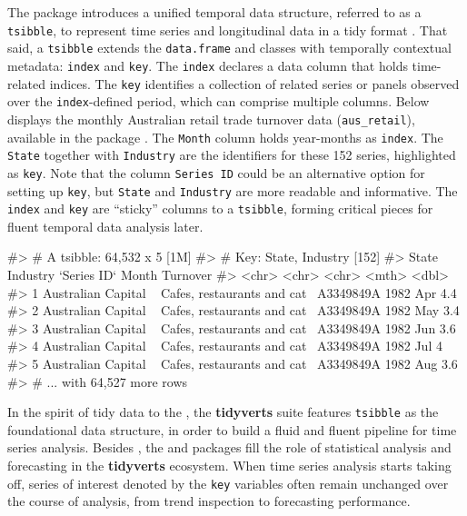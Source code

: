 The  package \citep{wang2020tsibble} introduces a
unified temporal data structure, referred to as a \texttt{tsibble}, to
represent time series and longitudinal data in a tidy format
\citep{wickham2014tidy}. That said, a \texttt{tsibble} extends the
\texttt{data.frame} and  classes with temporally
contextual metadata: \texttt{index} and \texttt{key}. The \texttt{index}
declares a data column that holds time-related indices. The \texttt{key}
identifies a collection of related series or panels observed over the
\texttt{index}-defined period, which can comprise multiple columns.
Below displays the monthly Australian retail trade turnover data
(\texttt{aus\_retail}), available in the  package
\citep{R-tsibbledata}. The \texttt{Month} column holds year-months as
\texttt{index}. The \texttt{State} together with \texttt{Industry} are
the identifiers for these 152 series, highlighted as \texttt{key}. Note
that the column \texttt{Series\ ID} could be an alternative option for
setting up \texttt{key}, but \texttt{State} and \texttt{Industry} are
more readable and informative. The \texttt{index} and \texttt{key} are
``sticky'' columns to a \texttt{tsibble}, forming critical pieces for
fluent temporal data analysis later.

\begin{Schunk}
\begin{Soutput}
#> # A tsibble: 64,532 x 5 [1M]
#> # Key:       State, Industry [152]
#>   State                Industry                    `Series ID`    Month Turnover
#>   <chr>                <chr>                       <chr>          <mth>    <dbl>
#> 1 Australian Capital ~ Cafes, restaurants and cat~ A3349849A   1982 Apr      4.4
#> 2 Australian Capital ~ Cafes, restaurants and cat~ A3349849A   1982 May      3.4
#> 3 Australian Capital ~ Cafes, restaurants and cat~ A3349849A   1982 Jun      3.6
#> 4 Australian Capital ~ Cafes, restaurants and cat~ A3349849A   1982 Jul      4  
#> 5 Australian Capital ~ Cafes, restaurants and cat~ A3349849A   1982 Aug      3.6
#> # ... with 64,527 more rows
\end{Soutput}
\end{Schunk}

In the spirit of tidy data to the 
\citep{Wickham2019}, the \textbf{tidyverts} suite features
\texttt{tsibble} as the foundational data structure, in order to build a
fluid and fluent pipeline for time series analysis. Besides
, the  \citep{R-feasts} and
 \citep{R-fable} packages fill the role of statistical
analysis and forecasting in the \textbf{tidyverts} ecosystem. When time
series analysis starts taking off, series of interest denoted by the
\texttt{key} variables often remain unchanged over the course of
analysis, from trend inspection to forecasting performance.

